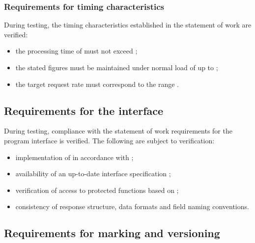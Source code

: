 \documentclass[12pt,a4paper]{extarticle}
\begin{document}
\subsubsection{Requirements for timing characteristics}

\begin{hseExample}
During testing, the timing characteristics established in the statement of work are verified:

\begin{itemize}[leftmargin=1.25cm]
    \item the processing time of  must not exceed ;
    \item the stated figures must be maintained under normal load of up to ;
    \item the target request rate must correspond to the range .
\end{itemize}
\end{hseExample}

\subsection{Requirements for the interface}

\begin{hseExample}
During testing, compliance with the statement of work requirements for the program interface is verified. The following are subject to verification:

\begin{itemize}[leftmargin=1.25cm]
    \item implementation of  in accordance with ;
    \item availability of an up-to-date interface specification ;
    \item verification of access to protected functions based on ;
    \item consistency of response structure, data formats and field naming conventions.
\end{itemize}
\end{hseExample}

\subsection{Requirements for marking and versioning}
\end{document}
